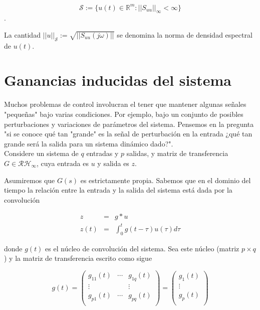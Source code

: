 \begin{equation*}
    \mathcal{S} := \{ u(t) \in \mathbb{R}^m : || S_{uu}||_{\infty} < \infty \}
\end{equation*}.

La cantidad $||u||_\mathcal{S} := \sqrt{ ||S_{uu}(j \omega)||}$ se denomina la norma de densidad espectral de $u(t)$. \\



\section{Ganancias inducidas del sistema}

Muchos problemas de control involucran el tener que mantener algunas señales "pequeñas" bajo varias condiciones. Por ejemplo, bajo un conjunto de posibles perturbaciones y variaciones de parámetros del sistema. Pensemos en la pregunta "si se conoce qué tan "grande" es la señal de perturbación en la entrada ¿qué tan grande será la salida para un sistema dinámico dado?". \\

Considere un sistema de $q$ entradas y $p$ salidas, y matriz de transferencia $G \in \mathcal{R} \mathcal{H}_\infty$, cuya entrada es $u$ y salida es $z$.

Asumiremos que $G(s)$ es estrictamente propia. Sabemos que en el dominio del tiempo la relación entre la entrada y la salida del sistema está dada por la convolución

\begin{eqnarray*}
    z &=& g *u \\
    z(t)&=& \int_0^t g(t- \tau)  u(\tau) d\tau
\end{eqnarray*}

donde $g(t)$ es el núcleo de convolución del sistema. Sea este núcleo (matriz $p \times q$) y la matriz de transferencia escrito como sigue

\begin{equation*}
  g(t) = \left(
\begin{array}{ccc}
 g_{11}(t) & \cdots & g_{1q}(t) \\
 \vdots &  & \vdots \\
 g_{p1}(t) & \cdots & g_{pq}(t) \\
\end{array}
\right) = \left(
\begin{array}{c}
 g_1(t) \\
 \vdots \\
 g_p(t) \\
\end{array}
\right)
\end{equation*}

